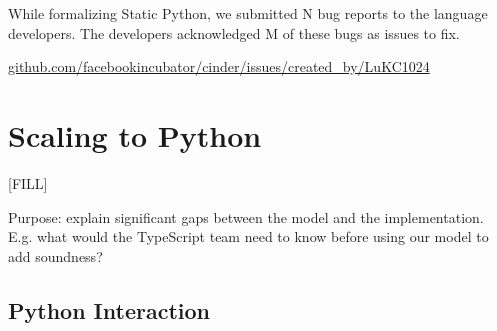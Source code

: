 \documentclass[english,cleveref,submission]{programming}
\newcommand{\shorturl}[2]{\href{#1#2}{#2}}
\begin{document}
While formalizing Static Python, we submitted N bug reports to the language developers.
The developers acknowledged M of these bugs as issues to fix.

\begin{center}
  \shorturl{https://}{github.com/facebookincubator/cinder/issues/created\_by/LuKC1024}
\end{center}


\section{Scaling to Python}
\label{s:impl}







[FILL]

Purpose: explain significant gaps between the model and the implementation.
E.g. what would the TypeScript team need to know before using our model
to add soundness?


\subsection{Python Interaction}
\end{document}
